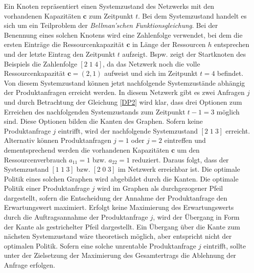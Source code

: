Ein Knoten repräsentiert einen Systemzustand des Netzwerks mit den vorhandenen Kapazitäten $\textbf{c}$ zum Zeitpunkt $t$. Bei dem Systemzustand handelt es sich um ein Teilproblem der \textit{Bellman'schen Funktionsgleichung}. Bei der Benennung eines solchen Knotens wird eine Zahlenfolge verwendet, bei dem die ersten Einträge die Ressourcenkapazität $\textbf{c}$ in Länge der Ressourcen $h$ entsprechen und der letzte Eintrag den Zeitpunkt $t$ aufzeigt. Bspw. zeigt der Startknoten des Beispiels die Zahlenfolge $[2\;1\;4]$, da das Netzwerk noch die volle Ressourcenkapazität $\textbf{c}=(2,1)$ aufweist und sich im Zeitpunkt $t=4$ befindet. Von diesem Systemzustand können jetzt nachfolgende Systemzustände abhängig der Produktanfragen erreicht werden. In diesem Netzwerk gibt es zwei Anfragen $j$ und durch Betrachtung der Gleichung \eqref{DP2} wird klar, dass drei Optionen zum Erreichen des nachfolgenden Systemzustands zum Zeitpunkt $t-1=3$ möglich sind. Diese Optionen bilden die Kanten des Graphen. Sofern keine Produktanfrage $j$ eintrifft, wird der nachfolgende Systemzustand $[2\;1\;3]$ erreicht. Alternativ können Produktanfragen $j=1$ oder $j=2$ eintreffen und dementsprechend werden die vorhandenen Kapazitäten $\textbf{c}$ um den Ressourcenverbrauch $a_{11}=1$ bzw. $a_{22}=1$ reduziert. Daraus folgt, dass der Systemzustand $[1\;1\;3]$ bzw. $[2\;0\;3]$ im Netzwerk erreichbar ist. Die optimale Politik eines solchen Graphen wird abgebildet durch die Kanten. Die optimale Politik einer Produktanfrage $j$ wird im Graphen als durchgezogener Pfeil dargestellt, sofern die Entscheidung der Annahme der Produktanfrage den Erwartungswert maximiert. Erfolgt keine Maximierung des Erwartungswerts durch die Auftragsannahme der Produktanfrage $j$, wird der Übergang in Form der Kante als gestrichelter Pfeil dargestellt. Ein Übergang über die Kante zum nächsten Systemzustand wäre theoretisch möglich, aber entspricht nicht der optimalen Politik. Sofern eine solche unrentable Produktanfrage $j$ eintrifft, sollte unter der Zielsetzung der Maximierung des Gesamtertrags die Ablehnung der Anfrage erfolgen.

